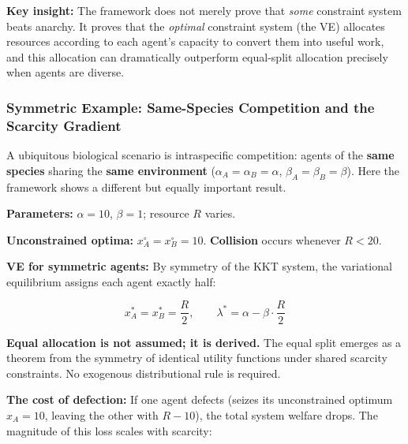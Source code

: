 \documentclass[11pt]{article}
\theoremstyle{plain}
\theoremstyle{definition}
\theoremstyle{remark}
\let\origsubsubsection\subsubsection
\renewcommand{\subsubsection}{\needspace{4\baselineskip}\origsubsubsection}
\begin{document}
\textbf{Key insight:} The framework does not merely prove that
\emph{some} constraint system beats anarchy. It proves that the
\emph{optimal} constraint system (the VE) allocates resources according
to each agent's capacity to convert them into useful work, and this
allocation can dramatically outperform equal-split allocation precisely
when agents are diverse.

\subsubsection{Symmetric Example: Same-Species Competition and the
Scarcity
Gradient}\label{symmetric-example-same-species-competition-and-the-scarcity-gradient}

A ubiquitous biological scenario is intraspecific competition: agents of
the \textbf{same species} sharing the \textbf{same environment}
(\(\alpha_A = \alpha_B = \alpha\), \(\beta_A = \beta_B = \beta\)). Here
the framework shows a different but equally important result.

\textbf{Parameters:} \(\alpha = 10\), \(\beta = 1\); resource \(R\)
varies.

\textbf{Unconstrained optima:} \(x_A^{\circ} = x_B^{\circ} = 10\).
\textbf{Collision} occurs whenever \(R < 20\).

\textbf{VE for symmetric agents:} By symmetry of the KKT system, the
variational equilibrium assigns each agent exactly half:

\[x_A^* = x_B^* = \frac{R}{2}, \qquad \lambda^* = \alpha - \beta \cdot \frac{R}{2}\]

\textbf{Equal allocation is not assumed; it is derived.} The equal split
emerges as a theorem from the symmetry of identical utility functions
under shared scarcity constraints. No exogenous distributional rule is
required.

\textbf{The cost of defection:} If one agent defects (seizes its
unconstrained optimum \(x_A = 10\), leaving the other with \(R - 10\)),
the total system welfare drops. The magnitude of this loss scales with
scarcity:
\end{document}
